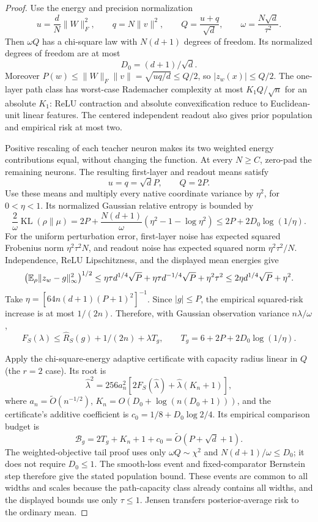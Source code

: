 \begin{proof}
Use the energy and precision normalization
\[
 u=\frac dN\|W\|_F^2,\qquad q=N\|v\|^2,
 \qquad Q=\frac{u+q}{\sqrt d},\qquad
 \omega=\frac{N\sqrt d}{\tau^2}.
\]
Then $\omega Q$ has a chi-square law with $N(d+1)$ degrees of freedom. Its normalized degrees of freedom are at most
\[
 D_0=(d+1)/\sqrt d.
\]
Moreover $P(w)\le\|W\|_F\|v\|=\sqrt{uq/d}\le Q/2$, so $|z_w(x)|\le Q/2$. The one-layer path class has worst-case Rademacher complexity at most $K_1Q/\sqrt n$ for an absolute $K_1$: ReLU contraction and absolute convexification reduce to Euclidean-unit linear features. The centered independent readout also gives prior population and empirical risk at most two.

Positive rescaling of each teacher neuron makes its two weighted energy contributions equal, without changing the function. At every $N\ge C$, zero-pad the remaining neurons. The resulting first-layer and readout means satisfy
\[
 u=q=\sqrt dP,\qquad Q=2P.
\]
Use these means and multiply every native coordinate variance by $\eta^2$, for $0<\eta<1$. Its normalized Gaussian relative entropy is bounded by
\[
 \frac2\omega\operatorname{KL}(\rho\|\mu)
 =2P+\frac{N(d+1)}\omega(\eta^2-1-\log\eta^2)
 \le2P+2D_0\log(1/\eta).
\]
For the uniform perturbation error, first-layer noise has expected squared Frobenius norm $\eta^2\tau^2N$, and readout noise has expected squared norm $\eta^2\tau^2/N$. Independence, ReLU Lipschitzness, and the displayed mean energies give
\[
 \left(\mathbb E_\rho\|z_w-g\|_{\infty}^2\right)^{1/2}
 \le\eta\tau d^{1/4}\sqrt P
       +\eta\tau d^{-1/4}\sqrt P+\eta^2\tau^2
 \le2\eta d^{1/4}\sqrt P+\eta^2.
\]
Take $\eta=[64n(d+1)(P+1)^2]^{-1}$. Since $|g|\le P$, the empirical squared-risk increase is at most $1/(2n)$. Therefore, with Gaussian observation variance $n\lambda/\omega$,
\[
 F_S(\lambda)\le\widehat R_S(g)+1/(2n)+\lambda T_g,
 \qquad T_g=6+2P+2D_0\log(1/\eta).
\]

Apply the chi-square-energy adaptive certificate with capacity radius linear in $Q$ (the $r=2$ case). Its root is
\[
 \widehat\lambda^2
 =256a_n^2[2F_S(\widehat\lambda)+\widehat\lambda(K_n+1)],
\]
where $a_n=\widetilde O(n^{-1/2})$, $K_n=O(D_0+\log(n(D_0+1)))$, and the certificate's additive coefficient is $c_0=1/8+D_0\log2/4$. Its empirical comparison budget is
\[
 \mathcal B_g=2T_g+K_n+1+c_0
             =\widetilde O(P+\sqrt d+1).
\]
The weighted-objective tail proof uses only $\omega Q\sim\chi^2$ and $N(d+1)/\omega\le D_0$; it does not require $D_0\le1$. The smooth-loss event and fixed-comparator Bernstein step therefore give the stated population bound. These events are common to all widths and scales because the path-capacity class already contains all widths, and the displayed bounds use only $\tau\le1$. Jensen transfers posterior-average risk to the ordinary mean.
\end{proof}
